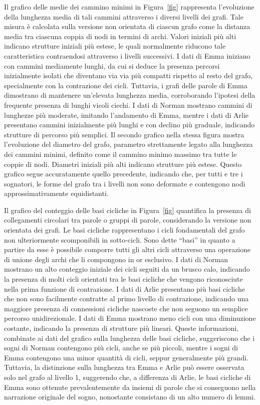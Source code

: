 Il grafico delle medie dei cammino minimi in Figura~\ref{fig} rappresenta l'evoluzione della lunghezza media di tali
cammini attraverso i diversi livelli dei grafi.
Tale misura è calcolata sulla versione non orientata di ciascun grafo come la distanza media tra ciascuna coppia di
nodi in termini di archi.
Valori iniziali più alti indicano strutture iniziali più estese, le quali normalmente riducono tale caratteristica
contraendosi attraverso i livelli successivi.
I dati di Emma iniziano con cammini mediamente lunghi, da cui si deduce la presenza percorsi inizialmente isolati
che diventano via via più compatti rispetto al resto del grafo, specialmente con la contrazione dei cicli.
Tuttavia, i grafi delle parole di Emma dimostrano di mantenere un'elevata lunghezza media, corroborando l'ipotesi
della frequente presenza di lunghi vicoli ciechi.
I dati di Norman mostrano cammini di lunghezze più moderate, imitando l'andamento di Emma,
mentre i dati di Arlie presentano cammini inizialmente più lunghi e con declino più graduale, indicando strutture di
percorso più semplici.
Il secondo grafico nella stessa figura mostra l'evoluzione del diametro del grafo, parametro strettamente legato
alla lunghezza dei cammini minimi, definito come il cammino minimo massimo tra tutte le coppie di nodi.
Diametri iniziali più alti indicano strutture più estese. Questo grafico segue accuratamente quello precedente,
indicando che, per tutti e tre i sognatori, le forme del grafo tra i livelli non sono deformate e contengono nodi
approssimativamente equidistanti.

Il grafico del conteggio delle basi cicliche in Figura~\ref{fig} quantifica la presenza di collegamenti circolari tra
parole o gruppi di parole, considerando la versione non orientata dei grafi.
Le basi cicliche rappresentano i cicli fondamentali del grafo non ulteriormente scomponibili in sotto-cicli.
Sono dette ``basi'' in quanto a partire da esse è possibile comporre tutti gli altri cicli attraverso una operazione di
unione degli archi che li compongono in or esclusivo.
I dati di Norman mostrano un alto conteggio iniziale dei cicli seguiti da un brusco calo, indicando la presenza di molti
cicli orientati tra le basi cicliche che vengono riconosciute nella prima funzione di contrazione.
I dati di Arlie presentano più basi cicliche che non sono facilmente contratte al primo livello di contrazione,
indicando una maggiore presenza di connessioni cicliche nascoste che non seguono un semplice percorso unidirezionale.
I dati di Emma mostrano meno cicli con una diminuzione costante, indicando la presenza di strutture più lineari.
Queste informazioni, combinate ai dati del grafico sulla lunghezza delle basi cicliche, suggeriscono che i sogni di
Norman contengono più cicli, anche se più piccoli, mentre i sogni di Emma contengono una minor quantità di cicli,
seppur generalmente più grandi.
Tuttavia, la distinzione sulla lunghezza tra Emma e Arlie può essere osservata solo nel grafo al livello 1, suggerendo
che, a differenza di Arlie, le basi cicliche di Emma sono ottenute prevalentemente da insiemi di parole che si
conseguono nella narrazione originale del sogno, nonostante consistano di un alto numero di lemmi.

